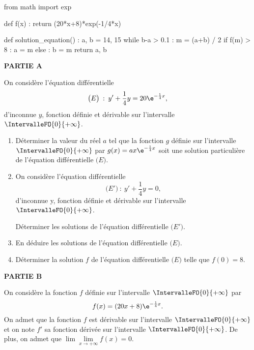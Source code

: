 \begin{scontents}[overwrite,write-out=as2024j1exo1.py]
from math import exp

def f(x) :
	return (20*x+8)*exp(-1/4*x)

def solution_equation() :
	a, b = 14, 15
	while b-a > 0.1 :
		m = (a+b) / 2
		if f(m) > 8 :
			a = m
		else :
			b = m
	return a, b
\end{scontents}
\textbf{PARTIE A}

\medskip

On considère l’équation différentielle \[ \big(E\big)\::\:y'+\frac14y=20\e^{-\frac14x}, \]
%
d’inconnue $y$, fonction définie et dérivable sur l’intervalle $\IntervalleFO{0}{+\infty}$.

\begin{enumerate}
	\item Déterminer la valeur du réel $a$ tel que la fonction $g$ définie sur l’intervalle $\IntervalleFO{0}{+\infty}$ par $g(x) = ax\e^{-\frac14x}$ soit une solution particulière de l’équation différentielle $\big(E\big)$.
	\item On considère l’équation différentielle \[ \big(E'\big)\::\:y'+\frac14y=0, \]
	d’inconnue y, fonction définie et dérivable sur l’intervalle $\IntervalleFO{0}{+\infty}$.
	
	Déterminer les solutions de l’équation différentielle $\big(E'\big)$.
	\item En déduire les solutions de l’équation différentielle $\big(E\big)$.
	\item Déterminer la solution $f$ de l’équation différentielle $\big(E\big)$ telle que $f(0) = 8$.
\end{enumerate}

\smallskip

\textbf{PARTIE B}

\medskip

On considère la fonction $f$ définie sur l’intervalle $\IntervalleFO{0}{+\infty}$ par \[ f(x)=(20x+8)\e^{-\frac14x}. \]
%
On admet que la fonction $f$ est dérivable sur l’intervalle $\IntervalleFO{0}{+\infty}$ et on note $f'$ sa fonction dérivée sur l’intervalle $\IntervalleFO{0}{+\infty}$. De plus, on admet que $\lim\lim\limits_{x\to+\infty} f (x) = 0$.

